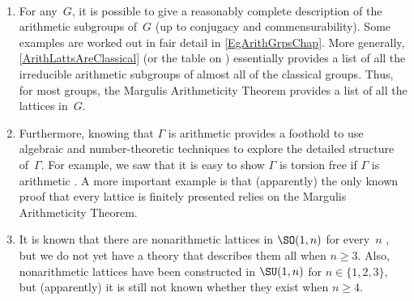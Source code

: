 \begin{rems} \ 
\noprelistbreak
	\begin{enumerate}
	\item For any~$G$, it is possible to give a reasonably complete
description of the arithmetic subgroups of~$G$ (up to
conjugacy and commensurability).
Some examples are worked out in fair detail in \cref{EgArithGrpsChap}.
More generally, \cref{ArithLattsAreClassical} (or the table on )
essentially provides a list of all the
irreducible arithmetic subgroups of almost all of the
classical groups. Thus, for most
groups, the Margulis Arithmeticity Theorem provides a
list of all the lattices in~$G$.

	\item Furthermore, knowing that $\Gamma$ is arithmetic provides a
foothold to use algebraic and number-theoretic techniques to
explore the detailed structure of~$\Gamma$. For example, we saw that it is easy to show $\Gamma$ is torsion free if $\Gamma$ is
arithmetic \csee{torsionfree}. A more important example is that (apparently) the
only known proof that every lattice is finitely presented
 relies on the Margulis Arithmeticity Theorem.

	\item It is known that there are nonarithmetic lattices in
$\SO(1,n)$ for every~$n$ , but we do
not yet have a theory that describes them all when $n \ge 3$.
 Also, nonarithmetic lattices have been constructed in
$\SU(1,n)$ for $n \in \{1,2,3\}$, but (apparently) it is
still not known whether they exist when $n \ge 4$.
	\end{enumerate}
 \end{rems}
 
